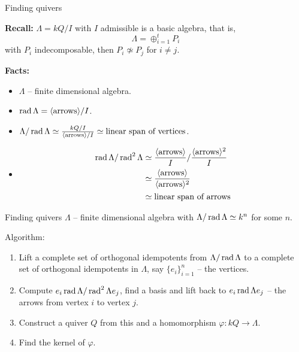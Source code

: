 \begin{frame}[fragile]{Finding quivers}

\textbf{Recall:} $\Lambda = kQ/I$ with $I$ admissible is a basic algebra, that is, 
\[\Lambda = \oplus_{i=1}^t P_i\]
with $P_i$ indecomposable, then $P_i\not\simeq P_j$ for $i\neq j$. 

\textbf{Facts:} 
\begin{itemize}
\item $\Lambda$ -- finite dimensional algebra.
\item $\operatorname{rad}\nolimits \Lambda = \langle \textrm{arrows}\rangle/I$.
\item $\Lambda/\operatorname{rad}\nolimits\Lambda \simeq \frac{kQ/I}{\langle
    \textrm{arrows}\rangle/I} \simeq \textrm{linear span of vertices}$.
\item \begin{align}
    \operatorname{rad}\nolimits\Lambda/\operatorname{rad}\nolimits^2\Lambda & \simeq \frac{\langle
    \textrm{arrows}\rangle}{I}/\frac{\langle
    \textrm{arrows}\rangle^2}{I} \notag\\
    & \simeq \frac{\langle
    \textrm{arrows}\rangle}{\langle \textrm{arrows}\rangle^2}\notag\\
   & \simeq \textrm{linear span of arrows}\notag
\end{align}
\end{itemize}
\end{frame}

\begin{frame}[fragile]{Finding quivers}
$\Lambda$ -- finite dimensional algebra with $\Lambda/\operatorname{rad}\nolimits\Lambda
\simeq k^n$ for some $n$.\medskip 

Algorithm:
\begin{enumerate}[\rm(1)]
\item Lift a complete set of orthogonal idempotents from
  $\Lambda/\operatorname{rad}\nolimits\Lambda$ to a complete set of orthogonal idempotents in
  $\Lambda$, say $\{e_i\}_{i=1}^n$ -- the vertices. 
\item Compute $e_i\operatorname{rad}\nolimits\Lambda/\operatorname{rad}\nolimits^2\Lambda e_j$, find a basis and
  lift back to $e_i\operatorname{rad}\nolimits\Lambda e_j$ -- the arrows from vertex $i$ to
  vertex $j$.   
\item Construct a quiver $Q$ from this and a homomorphism
  $\varphi\colon kQ \to \Lambda$. 
\item Find the kernel of $\varphi$. 
\end{enumerate}
\end{frame}

